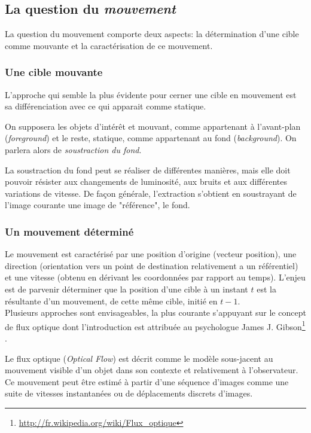 \documentclass[a4paper,12pt]{report}
\begin{document}
\subsection{La question du \textit{mouvement}}

	La question du mouvement comporte deux aspects: la détermination d'une cible comme mouvante et la caractérisation de ce mouvement.\\	
	
\subsubsection{Une cible mouvante}	
	L'approche qui semble la plus évidente pour cerner une cible en mouvement est sa différenciation avec ce qui apparait comme statique. 
	
	On supposera les objets d'intérêt et mouvant, comme appartenant à l'avant-plan (\textit{foreground}) et le reste, statique, comme appartenant au fond (\textit{background}). On parlera alors de \textit{soustraction du fond}.
	
	La soustraction du fond peut se réaliser de différentes manières, mais elle doit pouvoir résister aux changements de luminosité, aux bruits et aux différentes variations de vitesse.
	De façon générale, l'extraction s'obtient en soustrayant de l'image courante une image de "référence", le fond.\\

\subsubsection{Un mouvement déterminé}		
	Le mouvement est caractérisé par une position d'origine (vecteur position), une direction (orientation vers un point de destination relativement a un référentiel) et une vitesse (obtenu en dérivant les coordonnées par rapport au temps).	
	L'enjeu est de parvenir déterminer que la position d'une cible à un instant $t$ est la résultante d'un mouvement, de cette même cible, initié en $t-1$.\\
	
	Plusieurs approches sont envisageables, la plus courante s'appuyant sur le concept de flux optique dont l'introduction est attribuée au psychologue James J. Gibson\footnote{\url{http://fr.wikipedia.org/wiki/Flux_optique}} . 
	
	Le flux optique (\textit{Optical Flow}) est décrit comme le modèle sous-jacent au mouvement visible d'un objet dans son contexte et relativement à l'observateur. Ce mouvement peut être estimé à partir d'une séquence d'images comme une suite de vitesses instantanées ou de déplacements discrets d'images.\\ 
	
\end{document}
